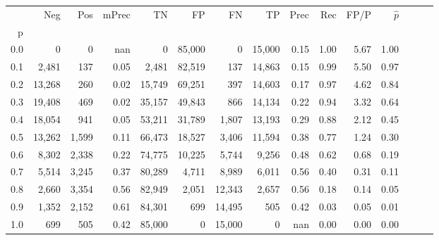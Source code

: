 \begin{tabular}{rrrrrrrrrrrrrrr}
\toprule
{} &     Neg &    Pos & mPrec &      TN &      FP &      FN &      TP &  Prec &   Rec &  FP/P & $\hat{p}$ \\
p   &         &        &       &         &         &         &         &       &       &       &           \\
\midrule
0.0 &       0 &      0 &   nan &       0 &  85,000 &       0 &  15,000 &  0.15 &  1.00 &  5.67 &      1.00 \\
0.1 &   2,481 &    137 &  0.05 &   2,481 &  82,519 &     137 &  14,863 &  0.15 &  0.99 &  5.50 &      0.97 \\
0.2 &  13,268 &    260 &  0.02 &  15,749 &  69,251 &     397 &  14,603 &  0.17 &  0.97 &  4.62 &      0.84 \\
0.3 &  19,408 &    469 &  0.02 &  35,157 &  49,843 &     866 &  14,134 &  0.22 &  0.94 &  3.32 &      0.64 \\
0.4 &  18,054 &    941 &  0.05 &  53,211 &  31,789 &   1,807 &  13,193 &  0.29 &  0.88 &  2.12 &      0.45 \\
0.5 &  13,262 &  1,599 &  0.11 &  66,473 &  18,527 &   3,406 &  11,594 &  0.38 &  0.77 &  1.24 &      0.30 \\
0.6 &   8,302 &  2,338 &  0.22 &  74,775 &  10,225 &   5,744 &   9,256 &  0.48 &  0.62 &  0.68 &      0.19 \\
0.7 &   5,514 &  3,245 &  0.37 &  80,289 &   4,711 &   8,989 &   6,011 &  0.56 &  0.40 &  0.31 &      0.11 \\
0.8 &   2,660 &  3,354 &  0.56 &  82,949 &   2,051 &  12,343 &   2,657 &  0.56 &  0.18 &  0.14 &      0.05 \\
0.9 &   1,352 &  2,152 &  0.61 &  84,301 &     699 &  14,495 &     505 &  0.42 &  0.03 &  0.05 &      0.01 \\
1.0 &     699 &    505 &  0.42 &  85,000 &       0 &  15,000 &       0 &   nan &  0.00 &  0.00 &      0.00 \\
\bottomrule
\end{tabular}
